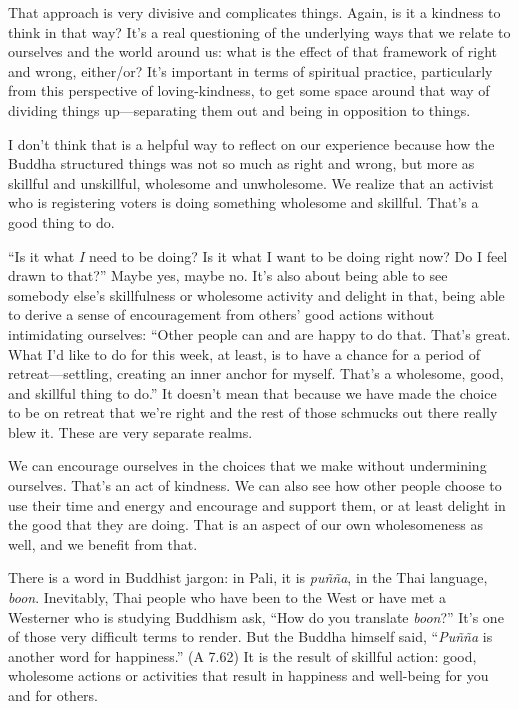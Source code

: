That approach is very divisive and complicates things. Again, is it a
kindness to think in that way? It’s a real questioning of the underlying
ways that we relate to ourselves and the world around us: what is the
effect of that framework of right and wrong, either/or? It’s important
in terms of spiritual practice, particularly from this perspective of
loving-kindness, to get some space around that way of dividing things
up—separating them out and being in opposition to things.

I don’t think that is a helpful way to reflect on our experience because
how the Buddha structured things was not so much as right and wrong, but
more as skillful and unskillful, wholesome and unwholesome. We realize
that an activist who is registering voters is doing something wholesome
and skillful. That’s a good thing to do.

“Is it what \emph{I} need to be doing? Is it what I want to be doing
right now? Do I feel drawn to that?” Maybe yes, maybe no. It’s also
about being able to see somebody else’s skillfulness or wholesome
activity and delight in that, being able to derive a sense of
encouragement from others’ good actions without intimidating ourselves:
“Other people can and are happy to do that. That’s great. What I’d like
to do for this week, at least, is to have a chance for a period of
retreat—settling, creating an inner anchor for myself. That’s a
wholesome, good, and skillful thing to do.” It doesn’t mean that because
we have made the choice to be on retreat that we’re right and the rest
of those schmucks out there really blew it. These are very separate
realms.

We can encourage ourselves in the choices that we make without
undermining ourselves. That’s an act of kindness. We can also see how
other people choose to use their time and energy and encourage and
support them, or at least delight in the good that they are doing. That
is an aspect of our own wholesomeness as well, and we benefit from that.

There is a word in Buddhist jargon: in Pali, it is \emph{puñña}, in the
Thai language, \emph{boon}. Inevitably, Thai people who have been to the
West or have met a Westerner who is studying Buddhism ask, “How do you
translate \emph{boon}?” It’s one of those very difficult terms to
render. But the Buddha himself said, “\emph{Puñña} is another word for
happiness.” (A 7.62) It is the result of skillful action: good,
wholesome actions or activities that result in happiness and well-being
for you and for others.

